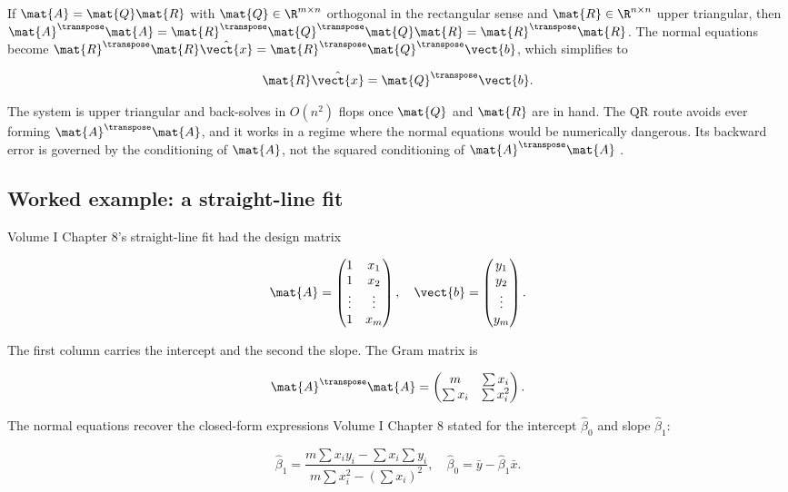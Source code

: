 If $\mat{A} = \mat{Q}\mat{R}$ with $\mat{Q} \in \R^{m \times n}$
orthogonal in the rectangular sense and $\mat{R} \in \R^{n \times n}$
upper triangular, then $\mat{A}^{\transpose}\mat{A} =
\mat{R}^{\transpose}\mat{Q}^{\transpose}\mat{Q}\mat{R} =
\mat{R}^{\transpose}\mat{R}$. The normal equations become
$\mat{R}^{\transpose}\mat{R}\hat{\vect{x}} = \mat{R}^{\transpose}
\mat{Q}^{\transpose}\vect{b}$, which simplifies to

\[
\mat{R}\hat{\vect{x}} = \mat{Q}^{\transpose}\vect{b}.
\]

The system is upper triangular and back-solves in $O(n^{2})$ flops
once $\mat{Q}$ and $\mat{R}$ are in hand. The QR route avoids ever
forming $\mat{A}^{\transpose}\mat{A}$, and it works in a regime
where the normal equations would be numerically dangerous. Its
backward error is governed by the conditioning of $\mat{A}$, not
the squared conditioning of $\mat{A}^{\transpose}\mat{A}$
\cite[ch.~19]{text:trefethen-bau1997}.

\subsection{Worked example: a straight-line fit}

Volume I Chapter 8's straight-line fit had the design matrix

\[
\mat{A} = \begin{pmatrix} 1 & x_{1} \\ 1 & x_{2} \\ \vdots & \vdots
\\ 1 & x_{m} \end{pmatrix}, \quad
\vect{b} = \begin{pmatrix} y_{1} \\ y_{2} \\ \vdots \\ y_{m}
\end{pmatrix}.
\]

The first column carries the intercept and the second the slope.
The Gram matrix is

\[
\mat{A}^{\transpose}\mat{A} = \begin{pmatrix} m & \sum x_{i} \\
\sum x_{i} & \sum x_{i}^{2} \end{pmatrix}.
\]

The normal equations recover the closed-form expressions Volume I
Chapter 8 stated for the intercept $\hat{\beta}_{0}$ and slope
$\hat{\beta}_{1}$:

\[
\hat{\beta}_{1} = \frac{m\sum x_{i} y_{i} - \sum x_{i} \sum y_{i}}
{m\sum x_{i}^{2} - (\sum x_{i})^{2}}, \quad
\hat{\beta}_{0} = \bar{y} - \hat{\beta}_{1}\bar{x}.
\]

